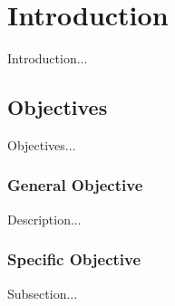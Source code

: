 \chapter{Introduction}

Introduction...

\section{Objectives}

Objectives...

\subsection{General Objective}

Description...

\subsection{Specific Objective}

Subsection...
